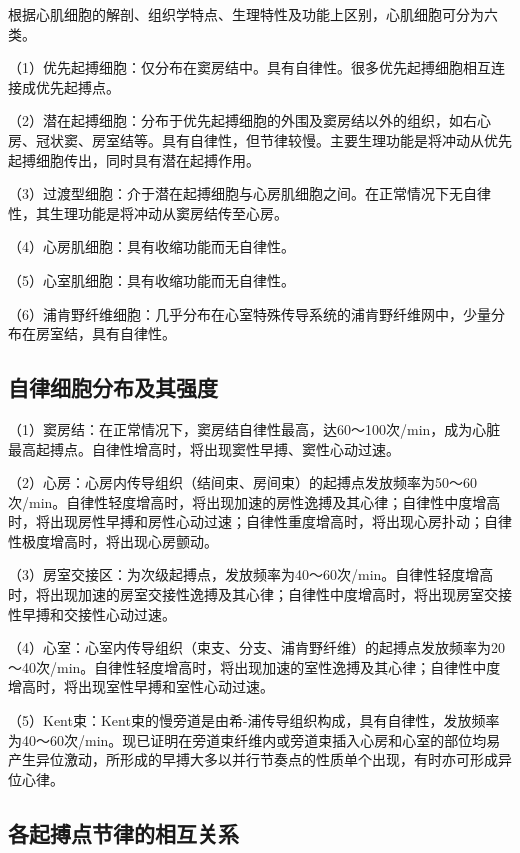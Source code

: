 根据心肌细胞的解剖、组织学特点、生理特性及功能上区别，心肌细胞可分为六类。

（1）优先起搏细胞：仅分布在窦房结中。具有自律性。很多优先起搏细胞相互连接成优先起搏点。

（2）潜在起搏细胞：分布于优先起搏细胞的外围及窦房结以外的组织，如右心房、冠状窦、房室结等。具有自律性，但节律较慢。主要生理功能是将冲动从优先起搏细胞传出，同时具有潜在起搏作用。

（3）过渡型细胞：介于潜在起搏细胞与心房肌细胞之间。在正常情况下无自律性，其生理功能是将冲动从窦房结传至心房。

（4）心房肌细胞：具有收缩功能而无自律性。

（5）心室肌细胞：具有收缩功能而无自律性。

（6）浦肯野纤维细胞：几乎分布在心室特殊传导系统的浦肯野纤维网中，少量分布在房室结，具有自律性。

\protect\hypertarget{text00022.htmlux5cux23subid252}{}{}

\subsection{自律细胞分布及其强度}

（1）窦房结：在正常情况下，窦房结自律性最高，达60～100次/min，成为心脏最高起搏点。自律性增高时，将出现窦性早搏、窦性心动过速。

（2）心房：心房内传导组织（结间束、房间束）的起搏点发放频率为50～60次/min。自律性轻度增高时，将出现加速的房性逸搏及其心律；自律性中度增高时，将出现房性早搏和房性心动过速；自律性重度增高时，将出现心房扑动；自律性极度增高时，将出现心房颤动。

（3）房室交接区：为次级起搏点，发放频率为40～60次/min。自律性轻度增高时，将出现加速的房室交接性逸搏及其心律；自律性中度增高时，将出现房室交接性早搏和交接性心动过速。

（4）心室：心室内传导组织（束支、分支、浦肯野纤维）的起搏点发放频率为20～40次/min。自律性轻度增高时，将出现加速的室性逸搏及其心律；自律性中度增高时，将出现室性早搏和室性心动过速。

（5）Kent束：Kent束的慢旁道是由希-浦传导组织构成，具有自律性，发放频率为40～60次/min。现已证明在旁道束纤维内或旁道束插入心房和心室的部位均易产生异位激动，所形成的早搏大多以并行节奏点的性质单个出现，有时亦可形成异位心律。

\protect\hypertarget{text00022.htmlux5cux23subid253}{}{}

\subsection{各起搏点节律的相互关系}

